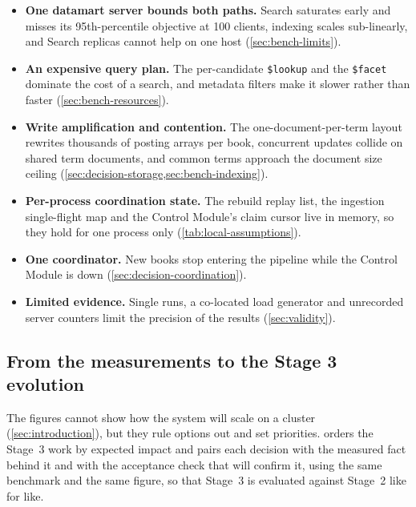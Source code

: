 \documentclass[10pt,a4paper]{article}
\newcommand{\code}[1]{\texttt{#1}}
\begin{document}
\begin{itemize}
  \item \textbf{One datamart server bounds both paths.} Search saturates early
  and misses its 95th-percentile objective at 100 clients, indexing scales
  sub-linearly, and Search replicas cannot help on one host
  (\cref{sec:bench-limits}).
  \item \textbf{An expensive query plan.} The per-candidate \code{\$lookup} and
  the \code{\$facet} dominate the cost of a search, and metadata filters make it
  slower rather than faster (\cref{sec:bench-resources}).
  \item \textbf{Write amplification and contention.} The one-document-per-term
  layout rewrites thousands of posting arrays per book, concurrent updates
  collide on shared term documents, and common terms approach the document
  size ceiling (\cref{sec:decision-storage,sec:bench-indexing}).
  \item \textbf{Per-process coordination state.} The rebuild replay list, the
  ingestion single-flight map and the Control Module's claim cursor live in
  memory, so they hold for one process only (\cref{tab:local-assumptions}).
  \item \textbf{One coordinator.} New books stop entering the pipeline while
  the Control Module is down (\cref{sec:decision-coordination}).
  \item \textbf{Limited evidence.} Single runs, a co-located load generator and
  unrecorded server counters limit the precision of the results
  (\cref{sec:validity}).
\end{itemize}

\subsection{From the measurements to the Stage 3 evolution}
\label{sec:evidence-to-design}
\label{sec:stage3}

The figures cannot show how the system will scale on a cluster
(\cref{sec:introduction}), but they rule options out and set priorities.
 orders the Stage~3 work by expected impact and pairs
each decision with the measured fact behind it and with the acceptance check
that will confirm it, using the same benchmark and the same figure, so that
Stage~3 is evaluated against Stage~2 like for like.
\end{document}
